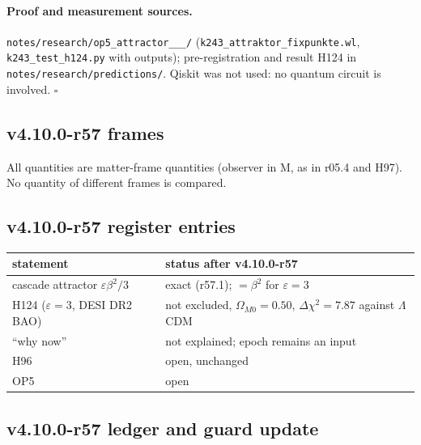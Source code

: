 \paragraph{Proof and measurement sources.}
\texttt{notes/\allowbreak research/\allowbreak op5\_\allowbreak attractor\_\_\_/} (\texttt{k243\_\allowbreak attraktor\_\allowbreak fixpunkte.wl},
\texttt{k243\_\allowbreak test\_\allowbreak h124.py} with outputs); pre-registration and result H124 in \texttt{notes/\allowbreak research/\allowbreak predictions/}.  Qiskit was not used:
no quantum circuit is involved.  \(\square\)

\subsection*{v4.10.0-r57 frames}
\label{subsec:v4100-r57-frames}

All quantities are matter-frame quantities (observer in M, as in r05.4 and H97).  No quantity of different frames is compared.

\subsection*{v4.10.0-r57 register entries}
\label{subsec:v4100-r57-register}

\begin{center}
\small
\begin{tabular}{@{}>{\raggedright\arraybackslash}p{}>{\raggedright\arraybackslash}p{}@{}}
\toprule
statement & status after v4.10.0-r57\\
\midrule
cascade attractor \(\varepsilon\beta^2/3\) & exact (r57.1); \(=\beta^2\) for \(\varepsilon=3\)\\
H124 (\(\varepsilon=3\), DESI DR2 BAO) & not excluded, \(\Omega_{M0}=0.50\), \(\Delta\chi^2=7.87\) against \(\Lambda\)CDM\\
``why now'' & not explained; epoch remains an input\\
H96 & open, unchanged\\
OP5 & open\\
\bottomrule
\end{tabular}
\end{center}

\subsection*{v4.10.0-r57 ledger and guard update}
\label{subsec:v4100-r57-ledger-guard}

